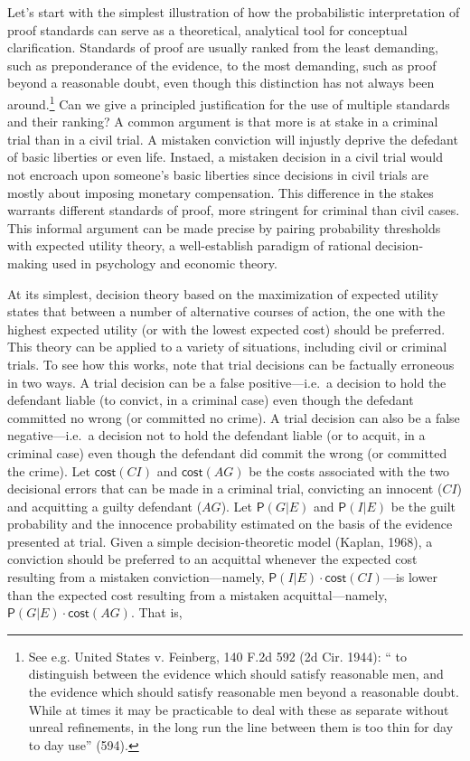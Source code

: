 \documentclass[10pt,dvipsnames,enabledeprecatedfontcommands]{scrartcl}
\newcommand{\pr}[1]{\mathsf{P}(#1)}
\newcommand{\cost}{\mathsf{cost}}
\begin{document}
Let's start with the simplest illustration of how the probabilistic
interpretation of proof standards can serve as a theoretical, analytical
tool for conceptual clarification. Standards of proof are usually ranked
from the least demanding, such as preponderance of the evidence, to the
most demanding, such as proof beyond a reasonable doubt, even though
this distinction has not always been
around.\footnote{See e.g. United States v. Feinberg, 140 F.2d 592 (2d Cir. 1944): `` to distinguish between the evidence which should satisfy reasonable men, and the evidence which should satisfy reasonable men beyond a reasonable doubt. While at times it may be practicable to deal with these as separate without unreal refinements, in the long run the line between them is too thin for day to day use'' (594).}
Can we give a principled justification for the use of multiple standards
and their ranking? A common argument is that more is at stake in a
criminal trial than in a civil trial. A mistaken conviction will
injustly deprive the defedant of basic liberties or even life. Instaed,
a mistaken decision in a civil trial would not encroach upon someone's
basic liberties since decisions in civil trials are mostly about
imposing monetary compensation. This difference in the stakes warrants
different standards of proof, more stringent for criminal than civil
cases. This informal argument can be made precise by pairing probability
thresholds with expected utility theory, a well-establish paradigm of
rational decision-making used in psychology and economic theory.

At its simplest, decision theory based on the maximization of expected
utility states that between a number of alternative courses of action,
the one with the highest expected utility (or with the lowest expected
cost) should be preferred. This theory can be applied to a variety of
situations, including civil or criminal trials. To see how this works,
note that trial decisions can be factually erroneous in two ways. A
trial decision can be a false positive---i.e.~a decision to hold the
defendant liable (to convict, in a criminal case) even though the
defedant committed no wrong (or committed no crime). A trial decision
can also be a false negative---i.e.~a decision not to hold the defendant
liable (or to acquit, in a criminal case) even though the defendant did
commit the wrong (or committed the crime). Let \(\cost(CI)\) and
\(\cost(AG)\) be the costs associated with the two decisional errors
that can be made in a criminal trial, convicting an innocent (\(CI\))
and acquitting a guilty defendant (\(AG\)). Let \(\pr{G | E}\) and
\(\pr{ I|E}\) be the guilt probability and the innocence probability
estimated on the basis of the evidence presented at trial. Given a
simple decision-theoretic model (Kaplan, 1968), a conviction should be
preferred to an acquittal whenever the expected cost resulting from a
mistaken conviction---namely, \(\pr{I | E } \cdot \cost(CI)\)---is lower
than the expected cost resulting from a mistaken acquittal---namely,
\(\pr{G | E} \cdot \cost(AG)\). That is,
\end{document}
